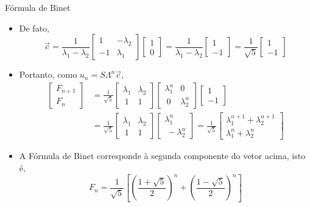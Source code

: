 \begin{frame}[fragile]{Fórmula de Binet}

    \begin{itemize}
        \item De fato,
        \[
            \vec{c} = \frac{1}{\lambda_1 - \lambda_2}\begin{bmatrix} 1 & -\lambda_2 \\ -1 & \lambda_1 \end{bmatrix}
\begin{bmatrix} 1 \\ 0 \end{bmatrix} = 
            \frac{1}{\lambda_1 - \lambda_2}\begin{bmatrix} 1 \\ -1 \end{bmatrix} =
            \frac{1}{\sqrt{5}}\begin{bmatrix} 1 \\ -1 \end{bmatrix}
        \]

        \item Portanto, como $u_n = S\Lambda^n \vec{c}$, 
        \begin{align*}
            \begin{bmatrix} F_{n + 1} \\ F_n \end{bmatrix} &= 
            \frac{1}{\sqrt{5}}\begin{bmatrix} \lambda_1 & \lambda_2 \\\ 1 & 1 \end{bmatrix}
            \begin{bmatrix} \lambda_1^n & 0 \\\ 0 & \lambda_2^n \end{bmatrix}
            \begin{bmatrix} 1 \\ -1 \end{bmatrix} \\
            &= \frac{1}{\sqrt{5}}
            \begin{bmatrix} \lambda_1 & \lambda_2 \\\ 1 & 1 \end{bmatrix}
            \begin{bmatrix} \lambda_1^n \\\ -\lambda_2^n \end{bmatrix} 
            = \frac{1}{\sqrt{5}}
            \begin{bmatrix} \lambda_1^{n + 1} + \lambda_2^{n + 1} \\ \lambda_1^{n} + \lambda_2^{n}   \end{bmatrix}
        \end{align*}

        \item A Fórmula de Binet corresponde à segunda componente do vetor acima, isto é,
        \[
            F_n = \frac{1}{\sqrt{5}}\left[\left(\frac{1 + \sqrt{5}}{2}\right)^{n} + \left(\frac{1 - \sqrt{5}}{2}\right)^{n}\right]
        \]
    \end{itemize}

\end{frame}

